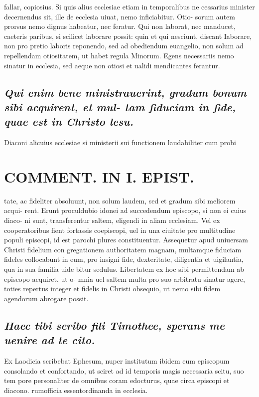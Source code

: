 \documentclass{article}
\begin{document}
\begin{pages}
fallar, copiosius. Si quis alius ecclesiae etiam in temporalibus ne cessarius minister decernendus sit, ille de ecclesia uiuat, nemo inficiabitur. Otio- sorum autem prorsus nemo dignus habeatur, nec feratur. Qui non laborat, nec manducet, caeteris paribus, si scilicet laborare possit: quin et qui nesciunt, discant Iaborare, non pro pretio laboris reponendo, sed ad obediendum euangelio, non solum ad repellendam otiositatem, ut habet regula Minorum. Egens necessariis nemo sinatur in ecclesia, sed aeque non otiosi et ualidi mendicantes ferantur.  \pend
{}
{}
\subsection*{\textit{Qui enim bene ministrauerint, gradum bonum sibi acquirent, et mul- tam fiduciam in fide, quae est in Christo lesu. }}\pstart Diaconi alicuius ecclesiae si ministerii sui functionem laudabiliter cum probi  \pend
\section*{COMMENT. IN I. EPIST. }
\marginpar{[ p.502 ]}\pstart tate, ac fideliter absoluunt, non solum laudem, sed et gradum sibi meliorem acqui- rent. Erunt proculdubio idonei ad succedendum episcopo, si non ei cuius diaco- ni sunt, transferentur saltem, eligendi in aliam ecclesiam. Vel ex cooperatoribus fient fortassis coepiscopi, uel in una ciuitate pro multitudine populi episcopi, id est parochi plures constituentur. Assequetur apud uniuersam Christi fidelium con gregationem authoritatem magnam, multamque fiduciam fideles collocabunt in eum, pro insigni fide, dexteritate, diligentia et uigilantia, qua in sua familia uide bitur sedulus. Libertatem ex hoc sibi permittendam ab episcopo acquiret, ut o- mnia uel saltem multa pro suo arbitratu sinatur agere, toties repertus integer et fidelis in Christi obsequio, ut nemo sibi fidem agendorum abrogare possit.  \pend
{}
{}
\subsection*{\textit{Haec tibi scribo fili Timothee, sperans me uenire ad te cito. }}\pstart Ex Laodicia scribebat Ephesum, nuper institutum ibidem eum episcopum consolando et confortando, ut sciret ad id temporis magis necessaria scitu, suo tem pore personaliter de omnibus coram edocturus, quae circa episcopi et diacono. rumofficia essentordinanda in ecclesia.  \pend
{}
{}

\end{pages}
\end{document}
